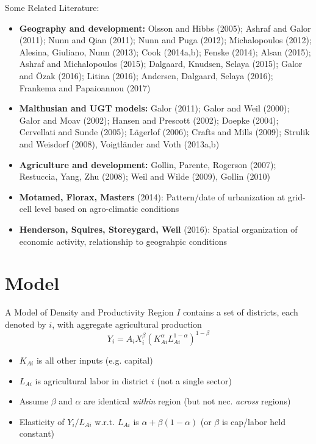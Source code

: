 \documentclass[10pt, xcolor=dvipsnames]{beamer}
\begin{document}
\begin{frame}{Some Related Literature:}
\begin{itemize}
  \item \textbf{Geography and development:} Olsson and Hibbs (2005); Ashraf and Galor (2011); Nunn and Qian (2011); Nunn and Puga (2012); Michalopoulos (2012); Alesina, Giuliano, Nunn (2013); Cook (2014a,b); Fenske (2014); Alsan (2015); Ashraf and Michalopoulos (2015); Dalgaard, Knudsen, Selaya (2015); Galor and {\"O}zak (2016); Litina (2016); Andersen, Dalgaard, Selaya (2016); Frankema and Papaioannou (2017)
  \item \textbf{Malthusian and UGT models:} Galor (2011); Galor and Weil (2000); Galor and Moav (2002); Hansen and Prescott (2002); Doepke (2004); Cervellati and Sunde (2005); L{\"a}gerlof (2006); Crafts and Mills (2009); Strulik and Weisdorf (2008), Voigtl{\"a}nder and Voth (2013a,b)
  \item \textbf{Agriculture and development:} Gollin, Parente, Rogerson (2007); Restuccia, Yang, Zhu (2008); Weil and Wilde (2009), Gollin (2010)
  \item \textbf{Motamed, Florax, Masters} (2014): Pattern/date of urbanization at grid-cell level based on agro-climatic conditions
  \item \textbf{Henderson, Squires, Storeygard, Weil} (2016): Spatial organization of economic activity, relationship to geograhpic conditions
\end{itemize}

\end{frame}

\section{Model}

\begin{frame}{A Model of Density and Productivity}
Region $I$ contains a set of districts, each denoted by $i$, with aggregate agricultural production
\begin{equation}
Y_{i} = A_{i} X_{i}^{\beta} \left(K_{Ai}^{\alpha}L_{Ai}^{1-\alpha}\right)^{1-\beta} \label{EQ_production}
\end{equation}
\begin{itemize}
  \item $K_{Ai}$ is all other inputs (e.g. capital)
  \item $L_{Ai}$ is agricultural labor in district $i$ (not a single sector)
  \item Assume $\beta$ and $\alpha$ are identical \textit{within} region (but not nec. \textit{across} regions)
  \item Elasticity of $Y_i/L_{Ai}$ w.r.t. $L_{Ai}$ is $\alpha + \beta(1-\alpha)$ (or $\beta$ is cap/labor held constant)
\end{itemize}
\end{frame}
\end{document}

